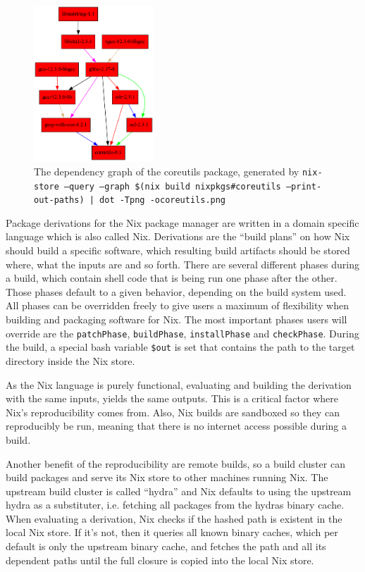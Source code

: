 \documentclass{eceasst}
\begin{document}
\begin{figure}
    \centering
    \includegraphics[width=0.4\textwidth]{figures/coreutils.png}
    \caption{The dependency graph of the coreutils package, generated by \texttt{nix-store --query --graph \$(nix build nixpkgs\#coreutils --print-out-paths) | dot -Tpng -ocoreutils.png}}
    \label{fig:nix-graph}
\end{figure}

Package derivations for the Nix package manager are written in a domain specific language which is also called Nix.
Derivations are the ``build plans'' on how Nix should build a specific software, which resulting build artifacts should be stored where, what the inputs are and so forth.
There are several different phases during a build, which contain shell code that is being run one phase after the other.
Those phases default to a given behavior, depending on the build system used.
All phases can be overridden freely to give users a maximum of flexibility when building and packaging software for Nix.
The most important phases users will override are the \texttt{patchPhase}, \texttt{buildPhase}, \texttt{installPhase} and \texttt{checkPhase}.
During the build, a special bash variable \texttt{\$out} is set that contains the path to the target directory inside the Nix store.

As the Nix language is purely functional, evaluating and building the derivation with the same inputs, yields the same outputs.
This is a critical factor where Nix's reproducibility comes from.
Also, Nix builds are sandboxed so they can reproducibly be run, meaning that there is no internet access possible during a build.

Another benefit of the reproducibility are remote builds, so a build cluster can build packages and serve its Nix store to other machines running Nix.
The upstream build cluster is called ``hydra'' and Nix defaults to using the upstream hydra as a substituter, i.e. fetching all packages from the hydras binary cache.
When evaluating a derivation, Nix checks if the hashed path is existent in the local Nix store.
If it's not, then it queries all known binary caches, which per default is only the upstream binary cache, and fetches the path and all its dependent paths until the full closure is copied into the local Nix store.
\end{document}

